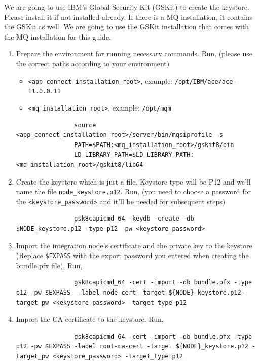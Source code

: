 \documentclass{article}
\begin{document}
\begin{enumerate}[itemsep=4ex]
        We are going to use IBM's Global Security Kit (GSKit) to create the keystore. Please install it if not installed already. If there is a MQ installation, it contains the GSKit as well. We are going to use the GSKit installation that comes with the MQ installation for this guide.
        \begin{enumerate}
            \item Prepare the environment for running necessary commands. Run, (please use the correct paths according to your environment)
            \begin{itemize}
                \item \lstinline{<app_connect_installation_root>}, example: \lstinline{/opt/IBM/ace/ace-11.0.0.11}
                \item \lstinline{<mq_installation_root>}, example: \lstinline{/opt/mqm}
            \end{itemize}
            \begin{lstlisting}
                source <app_connect_installation_root>/server/bin/mqsiprofile -s
                PATH=$PATH:<mq_installation_root>/gskit8/bin
                LD_LIBRARY_PATH=$LD_LIBRARY_PATH:<mq_installation_root>/gskit8/lib64
            \end{lstlisting}
            \item Create the keystore which is just a file. Keystore type will be P12 and we'll name the file \texttt{node\_keystore.p12}. Run, (you need to choose a password for the \lstinline{<keystore_password>} \label{keystore_password} and it'll be needed for subsequent steps)
            \begin{lstlisting}
                gsk8capicmd_64 -keydb -create -db $NODE_keystore.p12 -type p12 -pw <keystore_password>
            \end{lstlisting}
            \item Import the integration node's certificate and the private key to the keystore (Replace \lstinline{$EXPASS} with the export password you entered when creating the bundle.pfx file). Run,
            \begin{lstlisting}
                gsk8capicmd_64 -cert -import -db bundle.pfx -type p12 -pw $EXPASS  -label node-cert -target ${NODE}_keystore.p12 -target_pw <kekystore_password> -target_type p12
            \end{lstlisting}
            \item Import the CA certificate to the keystore. Run,
            \begin{lstlisting}
                gsk8capicmd_64 -cert -import -db bundle.pfx -type p12 -pw $EXPASS -label root-ca-cert -target ${NODE}_keystore.p12 -target_pw <keystore_password> -target_type p12
            \end{lstlisting}
        \end{enumerate}

    \end{enumerate}
\end{document}
